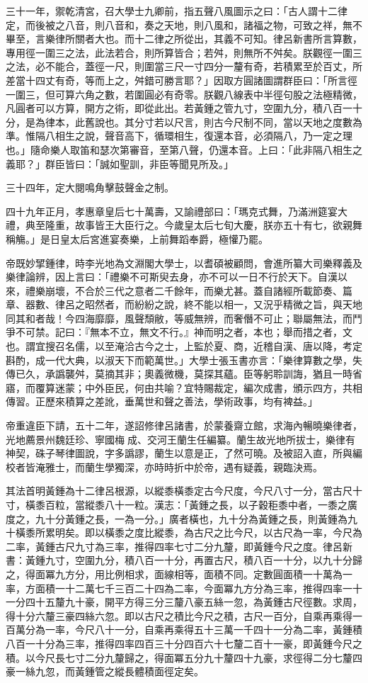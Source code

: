 \begin{pinyinscope}
三十一年，禦乾清宮，召大學士九卿前，指五聲八風圖示之曰：「古人謂十二律定，而後被之八音，則八音和，奏之天地，則八風和，諸福之物，可致之祥，無不畢至，言樂律所關者大也。而十二律之所從出，其義不可知。律呂新書所言算數，專用徑一圍三之法，此法若合，則所算皆合；若舛，則無所不舛矣。朕觀徑一圍三之法，必不能合，蓋徑一尺，則圍當三尺一寸四分一釐有奇，若積累至於百丈，所差當十四丈有奇，等而上之，舛錯可勝言耶？」因取方圓諸圖謂群臣曰：「所言徑一圍三，但可算六角之數，若圍圓必有奇零。朕觀八線表中半徑句股之法極精微，凡圓者可以方算，開方之術，即從此出。若黃鍾之管九寸，空圍九分，積八百一十分，是為律本，此舊說也。其分寸若以尺言，則古今尺制不同，當以天地之度數為準。惟隔八相生之說，聲音高下，循環相生，復還本音，必須隔八，乃一定之理也。」隨命樂人取笛和瑟次第審音，至第八聲，仍還本音。上曰：「此非隔八相生之義耶？」群臣皆曰：「誠如聖訓，非臣等聞見所及。」

三十四年，定大閱鳴角擊鼓聲金之制。

四十九年正月，孝惠章皇后七十萬壽，又諭禮部曰：「瑪克式舞，乃滿洲筵宴大禮，典至隆重，故事皆王大臣行之。今歲皇太后七旬大慶，朕亦五十有七，欲親舞稱觴。」是日皇太后宮進宴奏樂，上前舞蹈奉爵，極懽乃罷。

帝既妙揅鍾律，時李光地為文淵閣大學士，以耆碩被顧問，會進所纂大司樂釋義及樂律論辨，因上言曰：「禮樂不可斯臾去身，亦不可以一日不行於天下。自漢以來，禮樂崩壞，不合於三代之意者二千餘年，而樂尤甚。蓋自諸經所載節奏、篇章、器數、律呂之昭然者，而紛紛之說，終不能以相一，又況乎精微之旨，與天地同其和者哉！今四海靡靡，風聲頹敝，等威無辨，而奢僭不可止；聯屬無法，而鬥爭不可禁。記曰：『無本不立，無文不行。』神而明之者，本也；舉而措之者，文也。謂宜搜召名儒，以至淹洽古今之士，上監於夏、商，近稽自漢、唐以降，考定斟酌，成一代大典，以淑天下而範萬世。」大學士張玉書亦言：「樂律算數之學，失傳已久，承譌襲舛，莫摘其非；奧義微機，莫探其蘊。臣等躬聆訓誨，猶且一時省寤，而覆算迷蒙；中外臣民，何由共喻？宜特賜裁定，編次成書，頒示四方，共相傳習。正歷來積算之差訛，垂萬世和聲之善法，學術政事，均有裨益。」

帝重違臣下請，五十二年，遂詔修律呂諸書，於蒙養齋立館，求海內暢曉樂律者，光地薦景州魏廷珍、寧國梅成、交河王蘭生任編纂。蘭生故光地所拔士，樂律有神契，硃子琴律圖說，字多譌謬，蘭生以意是正，了然可曉。及被詔入直，所與編校者皆淹雅士，而蘭生學獨深，亦時時折中於帝，遇有疑義，親臨決焉。

其法首明黃鍾為十二律呂根源，以縱黍橫黍定古今尺度，今尺八寸一分，當古尺十寸，橫黍百粒，當縱黍八十一粒。漢志：「黃鍾之長，以子穀秬黍中者，一黍之廣度之，九十分黃鍾之長，一為一分。」廣者橫也，九十分為黃鍾之長，則黃鍾為九十橫黍所累明矣。即以橫黍之度比縱黍，為古尺之比今尺，以古尺為一率，今尺為二率，黃鍾古尺九寸為三率，推得四率七寸二分九釐，即黃鍾今尺之度。律呂新書：黃鍾九寸，空圍九分，積八百一十分，再置古尺，積八百一十分，以九十分歸之，得面冪九方分，用比例相求，面線相等，面積不同。定數圓面積一十萬為一率，方面積一十二萬七千三百二十四為二率，今面冪九方分為三率，推得四率一十一分四十五釐九十豪，開平方得三分三釐八豪五絲一忽，為黃鍾古尺徑數。求周，得十分六釐三豪四絲六忽。即以古尺之積比今尺之積，古尺一百分，自乘再乘得一百萬分為一率，今尺八十一分，自乘再乘得五十三萬一千四十一分為二率，黃鍾積八百一十分為三率，推得四率四百三十分四百六十七釐二百十一豪，即黃鍾今尺之積。以今尺長七寸二分九釐歸之，得面冪五分九十釐四十九豪，求徑得二分七釐四豪一絲九忽，而黃鍾管之縱長體積面徑定矣。


\end{pinyinscope}
